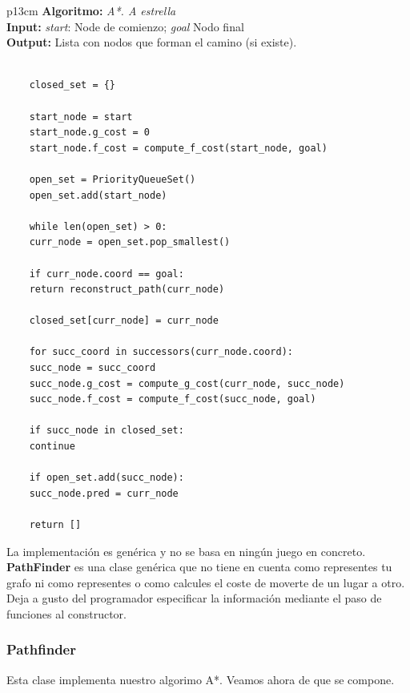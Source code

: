 \documentclass[a4paper,12pt,oneside]{book}
\renewcommand{\baselinestretch}{1.5}
\begin{document}
\begin{tabular}{  p{13cm}  }
  \hline    \hline                    
  {\bf Algoritmo:} {\it A*. A estrella}\\  \hline     
  {\bf Input:} {\it start}: Node de comienzo; {\it goal} Nodo final\\  \hline     
  {\bf Output:} Lista con nodos que forman el camino (si existe).\\  \hline     

  \hline  \hline 
\renewcommand{\baselinestretch}{1}
\normalsize
  \begin{lstlisting}

    closed_set = {}
    
    start_node = start
    start_node.g_cost = 0
    start_node.f_cost = compute_f_cost(start_node, goal)
    
    open_set = PriorityQueueSet()
    open_set.add(start_node)
    
    while len(open_set) > 0:
    curr_node = open_set.pop_smallest()
    
    if curr_node.coord == goal:
    return reconstruct_path(curr_node)
    
    closed_set[curr_node] = curr_node
    
    for succ_coord in successors(curr_node.coord):
    succ_node = succ_coord
    succ_node.g_cost = compute_g_cost(curr_node, succ_node)
    succ_node.f_cost = compute_f_cost(succ_node, goal)
    
    if succ_node in closed_set:
    continue
    
    if open_set.add(succ_node):
    succ_node.pred = curr_node
    
    return []

  \end{lstlisting} 
\end{tabular}
\renewcommand{\baselinestretch}{1.5}
\normalsize

La implementación es genérica y no se basa en ningún juego en
concreto. {\bf PathFinder} es una clase genérica que no tiene en
cuenta como representes tu grafo ni como representes o como calcules
el coste de moverte de un lugar a otro. Deja a gusto del programador
especificar la información mediante el paso de funciones al constructor.

\subsubsection{Pathfinder}
Esta clase implementa nuestro algorimo A*. Veamos ahora de que se compone.
\end{document}
